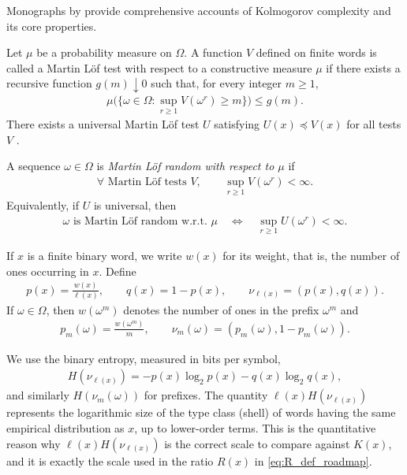 \documentclass[12pt]{article}
\newcommand{\be}{\begin{eqnarray}}
\newcommand{\ee}{\end{eqnarray}}
\newcommand{\dom}{\preceq}
\begin{document}
Monographs by \citep{LiVitanyi2008, DowneyHirschfeldt2010, Nies2009} provide
comprehensive accounts of Kolmogorov complexity and its core properties.

\medskip


Let $\mu$ be a probability measure on $\Omega$. A function $V$ defined on finite
words is called a Martin L\"of test with respect to a constructive measure $\mu$
if there exists a recursive function $g(m)\downarrow 0$ such that, for every
integer $m\ge 1$,
\be
\mu\Big(\big\{\omega\in\Omega:\sup_{r\ge 1} V(\omega^{r})\ge m\big\}\Big)\le g(m).
\label{eq:ML_test_def}
\ee
There exists a universal Martin L\"of test $U$ satisfying $U(x)\dom V(x)$ for all
tests $V$ \citep{MartinLof1966}.

A sequence $\omega\in\Omega$ is \emph{Martin L\"of random with respect to $\mu$} if
\be
\forall \text{ Martin L\"of tests } V,\qquad
\sup_{r\ge 1} V(\omega^{r})<\infty.
\label{eq:ML_random_def}
\ee
Equivalently, if $U$ is universal, then
\be
\omega \text{ is Martin L\"of random w.r.t. } \mu
\quad\Longleftrightarrow\quad
\sup_{r\ge 1} U(\omega^{r})<\infty.
\label{eq:ML_random_universal}
\ee

\medskip


If $x$ is a finite binary word, we write $w(x)$ for its weight, that is, the
number of ones occurring in $x$. Define
\be
p(x)=\frac{w(x)}{\ell(x)}, \qquad q(x)=1-p(x), \qquad \nu_{\ell(x)}=(p(x),q(x)).
\label{eq:empirical_dist_finite}
\ee
If $\omega\in\Omega$, then $w(\omega^{m})$ denotes the number of ones in the
prefix $\omega^{m}$ and
\be
p_m(\omega)=\frac{w(\omega^{m})}{m}, \qquad \nu_m(\omega)=(p_m(\omega),1-p_m(\omega)).
\label{eq:empirical_dist_prefix}
\ee

We use the binary entropy, measured in bits per symbol,
\be
H(\nu_{\ell(x)})=-p(x)\log_2 p(x)-q(x)\log_2 q(x),
\label{eq:binary_entropy_def}
\ee
and similarly $H(\nu_m(\omega))$ for prefixes. The quantity
$\ell(x)H(\nu_{\ell(x)})$ represents the logarithmic size of the type class
(shell) of words having the same empirical distribution as $x$, up to
lower-order terms. This is the quantitative reason why $\ell(x)H(\nu_{\ell(x)})$
is the correct scale to compare against $K(x)$, and it is exactly the scale used
in the ratio $R(x)$ in \eqref{eq:R_def_roadmap}.
\end{document}
